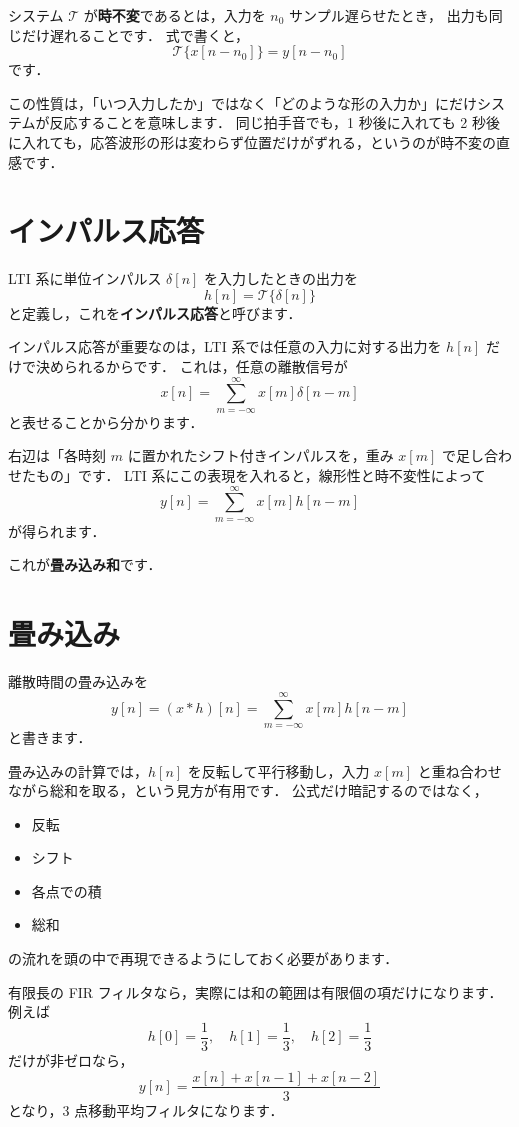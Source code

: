 システム $\mathcal{T}$ が\textbf{時不変}であるとは，入力を $n_0$ サンプル遅らせたとき，
出力も同じだけ遅れることです．
式で書くと，
\[
\mathcal{T}\{x[n-n_0]\} = y[n-n_0]
\]
です．

この性質は，「いつ入力したか」ではなく「どのような形の入力か」にだけシステムが反応することを意味します．
同じ拍手音でも，1 秒後に入れても 2 秒後に入れても，応答波形の形は変わらず位置だけがずれる，というのが時不変の直感です．


\section{インパルス応答}

LTI 系に単位インパルス $\delta[n]$ を入力したときの出力を
\[
h[n] = \mathcal{T}\{\delta[n]\}
\]
と定義し，これを\textbf{インパルス応答}と呼びます．

インパルス応答が重要なのは，LTI 系では任意の入力に対する出力を $h[n]$ だけで決められるからです．
これは，任意の離散信号が
\[
x[n] = \sum_{m=-\infty}^{\infty} x[m]\delta[n-m]
\]
と表せることから分かります．

右辺は「各時刻 $m$ に置かれたシフト付きインパルスを，重み $x[m]$ で足し合わせたもの」です．
LTI 系にこの表現を入れると，線形性と時不変性によって
\[
y[n] = \sum_{m=-\infty}^{\infty} x[m] h[n-m]
\]
が得られます．

これが\textbf{畳み込み和}です．


\section{畳み込み}

離散時間の畳み込みを
\[
y[n] = (x * h)[n] = \sum_{m=-\infty}^{\infty} x[m] h[n-m]
\]
と書きます．

畳み込みの計算では，$h[n]$ を反転して平行移動し，入力 $x[m]$ と重ね合わせながら総和を取る，という見方が有用です．
公式だけ暗記するのではなく，
\begin{itemize}
\item 反転
\item シフト
\item 各点での積
\item 総和
\end{itemize}
の流れを頭の中で再現できるようにしておく必要があります．

有限長の FIR フィルタなら，実際には和の範囲は有限個の項だけになります．
例えば
\[
h[0] = \frac{1}{3}, \quad h[1] = \frac{1}{3}, \quad h[2] = \frac{1}{3}
\]
だけが非ゼロなら，
\[
y[n] = \frac{x[n] + x[n-1] + x[n-2]}{3}
\]
となり，3 点移動平均フィルタになります．


